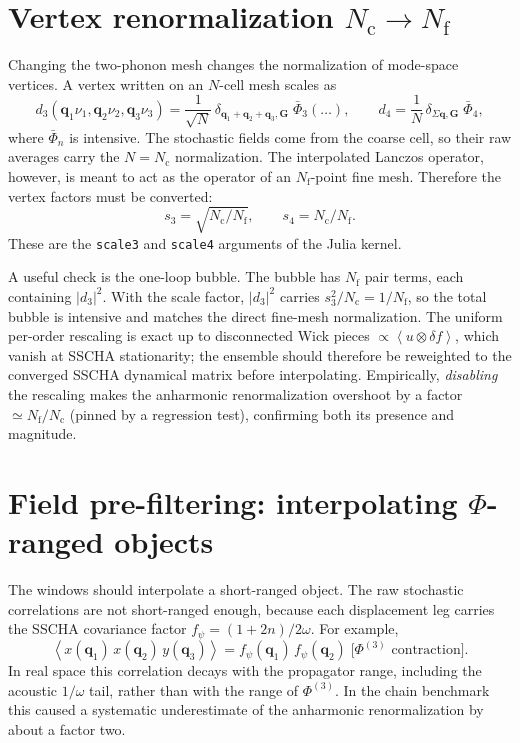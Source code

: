 \documentclass[11pt,a4paper]{article}
\newcommand{\qv}{\mathbf{q}}
\newcommand{\avg}[1]{\left\langle #1 \right\rangle}
\newcommand{\Nc}{N_{\mathrm{c}}}
\newcommand{\Nf}{N_{\mathrm{f}}}
\newcommand{\fpsi}{f_{\psi}}
\begin{document}
\section{Vertex renormalization $\Nc \to \Nf$}
\label{sec:rescaling}

Changing the two-phonon mesh changes the normalization of mode-space
vertices.  A vertex written on an $N$-cell mesh scales as
\begin{equation}
d_3(\qv_1\nu_1, \qv_2\nu_2, \qv_3\nu_3) = \frac{1}{\sqrt N}\,
\delta_{\qv_1+\qv_2+\qv_3, \mathbf G}\; \bar\Phi_3(\dots),
\qquad
d_4 = \frac{1}{N}\, \delta_{\Sigma \qv,\mathbf G}\; \bar\Phi_4,
\end{equation}
where $\bar\Phi_n$ is intensive.  The stochastic fields come from the
coarse cell, so their raw averages carry the $N=\Nc$ normalization.  The
interpolated Lanczos operator, however, is meant to act as the operator of
an $\Nf$-point fine mesh.  Therefore the vertex factors must be converted:
\[
s_3=\sqrt{\Nc/\Nf},\qquad s_4=\Nc/\Nf .
\]
These are the \texttt{scale3} and \texttt{scale4} arguments of the Julia
kernel.

A useful check is the one-loop bubble.  The bubble has $\Nf$ pair terms,
each containing $|d_3|^2$.  With the scale factor,
$|d_3|^2$ carries $s_3^2/\Nc=1/\Nf$, so the total bubble is intensive and
matches the direct fine-mesh normalization.  The uniform
per-order rescaling is exact up to disconnected Wick pieces
$\propto \avg{u\otimes\delta f}$, which vanish at SSCHA stationarity;
the ensemble should therefore be reweighted to the converged SSCHA
dynamical matrix before interpolating. Empirically, \emph{disabling} the
rescaling makes the anharmonic renormalization overshoot by a factor
$\simeq \Nf/\Nc$ (pinned by a regression test), confirming both its
presence and magnitude.

\section{Field pre-filtering: interpolating $\Phi$-ranged objects}
\label{sec:prefilter}

The windows should interpolate a short-ranged object.  The raw stochastic
correlations are not short-ranged enough, because each displacement leg
carries the SSCHA covariance factor
$\fpsi=(1+2n)/2\omega$.  For example,
\begin{equation}
\avg{x(\qv_1)\, x(\qv_2)\, y(\qv_3)} =
\fpsi(\qv_1)\,\fpsi(\qv_2)\; \bigl[\Phi^{(3)}\text{ contraction}\bigr].
\end{equation}
In real space this correlation decays with the propagator range, including
the acoustic $1/\omega$ tail, rather than with the range of
$\Phi^{(3)}$.  In the chain benchmark this caused a systematic
underestimate of the anharmonic renormalization by about a factor two.
\end{document}
